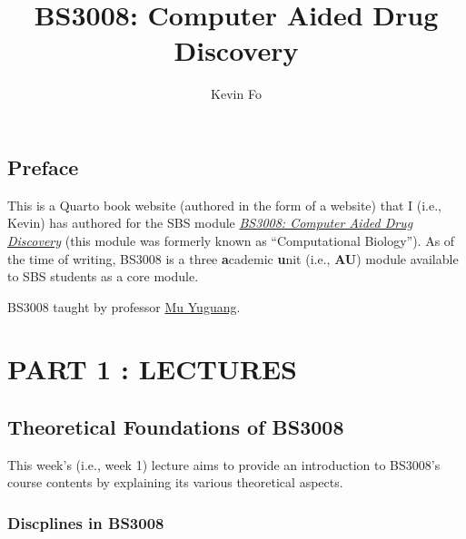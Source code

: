 \documentclass[
  letterpaper,
  DIV=11,
  numbers=noendperiod]{scrreprt}
\title{BS3008: Computer Aided Drug Discovery}
\author{Kevin Fo}
\date{}
\renewcommand*\contentsname{Table of contents}
\newcommand\contentsname{Table of contents}
\begin{document}
\maketitle
\ifdefined\Shaded\renewenvironment{Shaded}{\begin{tcolorbox}[frame hidden, borderline west={3pt}{0pt}{shadecolor}, breakable, enhanced, boxrule=0pt, sharp corners, interior hidden]}{\end{tcolorbox}}\fi

\renewcommand*\contentsname{Table of contents}
{
\hypersetup{linkcolor=}
\setcounter{tocdepth}{2}
\tableofcontents
}

\hypertarget{preface}{%
\chapter*{Preface}\label{preface}}

This is a Quarto book website (authored in the form of a website) that I
(i.e., Kevin) has authored for the SBS module
\href{https://labs.sbs.ntu.edu.sg/obtl/obtl.aspx?sch=sbs\&p=BS3008}{\emph{BS3008:
Computer Aided Drug Discovery}} (this module was formerly known as
``Computational Biology''). As of the time of writing, BS3008 is a three
\textbf{a}cademic \textbf{u}nit (i.e., \textbf{AU}) module available to
SBS students as a core module.

BS3008 taught by professor
\href{https://dr.ntu.edu.sg/cris/rp/rp00074}{Mu Yuguang}.

\part{\textbf{PART 1 : LECTURES}}

\hypertarget{theoretical-foundations-of-bs3008}{%
\chapter{Theoretical Foundations of
BS3008}\label{theoretical-foundations-of-bs3008}}

This week's (i.e., week 1) lecture aims to provide an introduction to
BS3008's course contents by explaining its various theoretical aspects.

\hypertarget{discplines-in-bs3008}{%
\section{Discplines in BS3008}\label{discplines-in-bs3008}}
\end{document}
